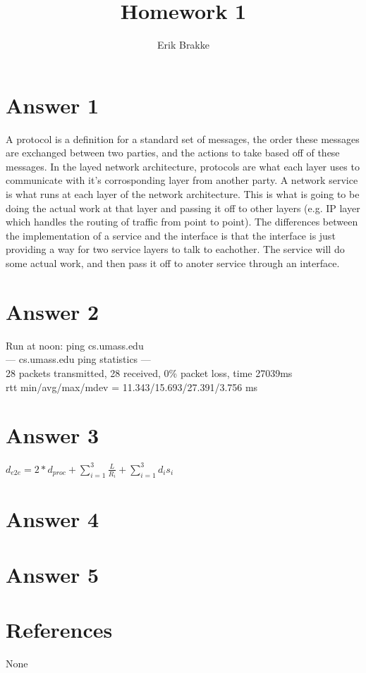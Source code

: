 \documentclass[11pt]{article}
\theoremstyle{definition}
\begin{document}
\title{Homework 1}
\author{Erik Brakke}
\maketitle

\thispagestyle{fancy}
 
 
\section*{Answer 1}
A protocol is a definition for a standard set of messages, the order these messages are exchanged between two parties, and the actions to take based off of these messages.  In the layed network architecture, protocols are what each layer uses to communicate with it's corrosponding layer from another party.  A network service is what runs at each layer of the network architecture.  This is what is going to be doing the actual work at that layer and passing it off to other layers (e.g. IP layer which handles the routing of traffic from point to point).  The differences between the implementation of a service and the interface is that the interface is just providing a way for two service layers to talk to eachother.  The service will do some actual work, and then pass it off to anoter service through an interface.  

\section*{Answer 2}
Run at noon: ping cs.umass.edu\\
--- cs.umass.edu ping statistics ---\\
28 packets transmitted, 28 received, 0\% packet loss, time 27039ms\\
rtt min/avg/max/mdev = 11.343/15.693/27.391/3.756 ms\\

\section*{Answer 3}
$d_{e2e} = 2*d_{proc} + \sum_{i=1}^3 \frac{L}{R_i} + \sum_{i=1}^3 d_i s_i$

\section*{Answer 4}

\section*{Answer 5}

\noindent\hrulefill


\section*{References}

None
\end{document}
